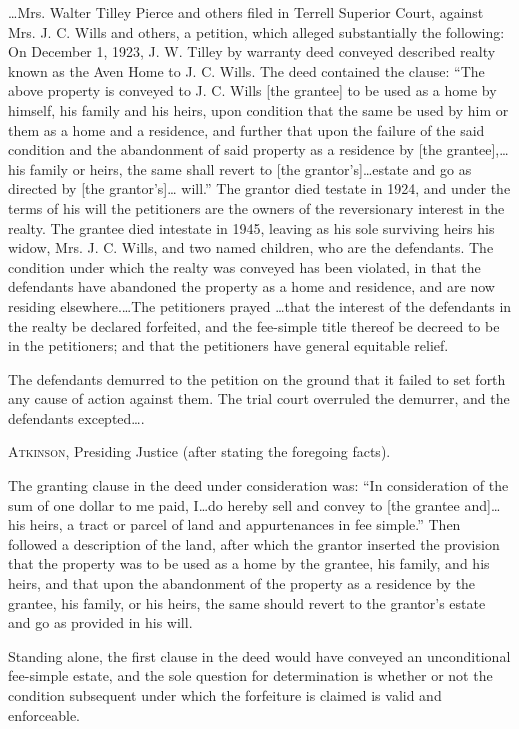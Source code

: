 
\dots Mrs. Walter Tilley Pierce and others filed in Terrell Superior Court,
against Mrs. J. C. Wills and others, a petition, which alleged substantially
the following: On December 1, 1923, J. W. Tilley by warranty deed conveyed
described realty known as the Aven Home to J. C. Wills. The deed contained the
clause: ``The above property is conveyed to J. C. Wills [the grantee] to be used
as a home by himself, his family and his heirs, upon condition that the same be
used by him or them as a home and a residence, and further that upon the
failure of the said condition and the abandonment of said property as a
residence by [the grantee],\dots his family or heirs, the same shall revert
to [the grantor's]\dots estate and go as directed by [the grantor's]\dots
will.'' The grantor died testate in 1924, and under the terms of his will the
petitioners are the owners of the reversionary interest in the realty. The
grantee died intestate in 1945, leaving as his sole surviving heirs his widow,
Mrs. J. C. Wills, and two named children, who are the defendants. The condition
under which the realty was conveyed has been violated, in that the defendants
have abandoned the property as a home and residence, and are now residing
elsewhere.\dots The petitioners prayed \dots that the interest of the
defendants in the realty be declared forfeited, and the fee-simple title
thereof be decreed to be in the petitioners; and that the petitioners have
general equitable relief.

The defendants demurred to the petition on the ground that it failed to set
forth any cause of action against them. The trial court overruled the demurrer,
and the defendants excepted\dots.

\textsc{Atkinson}, Presiding Justice (after stating the foregoing facts).

The granting clause in the deed under consideration was: ``In consideration of
the sum of one dollar to me paid, I\dots do hereby sell and convey to [the
grantee and]\dots his heirs, a tract or parcel of land and appurtenances in
fee simple.'' Then followed a description of the land, after which the grantor
inserted the provision that the property was to be used as a home by the
grantee, his family, and his heirs, and that upon the abandonment of the
property as a residence by the grantee, his family, or his heirs, the same
should revert to the grantor's estate and go as provided in his will.

Standing alone, the first clause in the deed would have conveyed an
unconditional fee-simple estate, and the sole question for determination is
whether or not the condition subsequent under which the forfeiture is claimed
is valid and enforceable.

